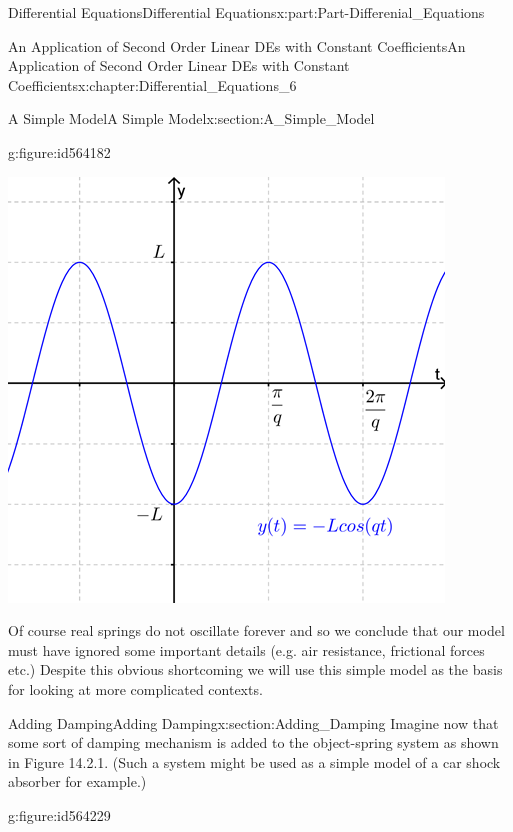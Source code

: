 \documentclass[oneside,10pt,]{book}
\numberwithin{equation}{section}
\begin{document}
\begin{partptx}{Differential Equations}{}{Differential Equations}{}{}{x:part:Part-Differenial_Equations}
\begin{chapterptx}{An Application of Second Order Linear DEs with Constant Coefficients}{}{An Application of Second Order Linear DEs with Constant Coefficients}{}{}{x:chapter:Differential_Equations_6}
\begin{sectionptx}{A Simple Model}{}{A Simple Model}{}{}{x:section:A_Simple_Model}
\begin{figureptx}{}{g:figure:id564182}{}
\begin{image}{0.2}{0.6}{0.2}%
\includegraphics[width=\linewidth]{./DifferentialEquations/Images/6/figure_3.png}
\end{image}%
\tcblower
\end{figureptx}%
 Of course real springs do not oscillate forever and so we conclude that our model must have ignored some important details (e.g. air resistance, frictional forces etc.) Despite this obvious shortcoming we will use this simple model as the basis for looking at more complicated contexts.%
\end{sectionptx}
%
%
\typeout{************************************************}
\typeout{************************************************}
%
\begin{sectionptx}{Adding Damping}{}{Adding Damping}{}{}{x:section:Adding_Damping}
Imagine now that some sort of damping mechanism is added to the object-spring system as shown in Figure 14.2.1. (Such a system might be used as a simple model of a car shock absorber for example.) \begin{figureptx}{}{g:figure:id564229}{}%
\begin{image}{0.2}{0.6}{0.2}%

\end{image}
\end{figureptx}
\end{sectionptx}
\end{chapterptx}
\end{partptx}
\end{document}

